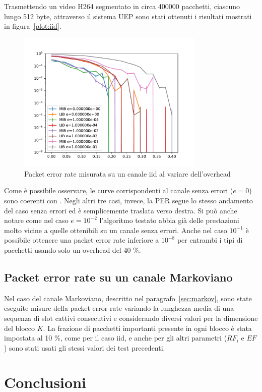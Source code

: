 \documentclass[italian, a4paper, 12pt]{article}
\begin{document}
Trasmettendo un video H264 segmentato in circa 400000 pacchetti,
ciascuno lungo 512 byte, attraverso il sistema UEP sono stati ottenuti
i risultati mostrati in figura~\ref{plot:iid}.
%
\begin{figure}[H]
    \centering
        \includegraphics[clip, trim=0cm 0cm 0cm 0cm, width=0.80\textwidth]{plot_ber_iid.pdf}
    \caption{Packet error rate misurata su un canale iid al variare
    dell'overhead}
    \label{fig:iid}
\end{figure}
%
Come è possibile osservare, le curve corrispondenti al canale senza
errori ($e=0$) sono coerenti con \cite{uep}. Negli altri tre casi,
invece, la PER segue lo stesso andamento del caso senza errori ed è
semplicemente traslata verso destra.
%
Si può anche notare come nel caso $e = 10^{-2}$ l'algoritmo testato
abbia già delle prestazioni molto vicine a quelle ottenibili su un
canale senza errori.
%
Anche nel caso $10^{-1}$ è possibile ottenere una packet error rate
inferiore a $10^{-8}$ per entrambi i tipi di pacchetti usando solo un
overhead del 40 \%.

\subsection{Packet error rate su un canale Markoviano}
Nel caso del canale Markoviano, descritto nel
paragrafo~\ref{sec:markov}, sono state eseguite misure della packet
error rate variando la lunghezza media di una sequenza di slot cattivi
consecutivi e considerando diversi valori per la dimensione del blocco
$K$.
%
La frazione di pacchetti importanti presente in ogni blocco è stata
impostata al 10 \%, come per il caso iid, e anche per gli altri
parametri ($RF_i$ e $EF$) sono stati usati gli stessi valori dei test
precedenti.
%

\section{Conclusioni}


\printbibliography[heading=bibnumbered, title=Bibliografia]
\end{document}
